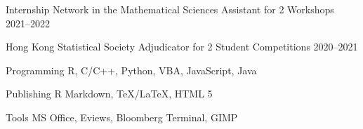 

\begin{cvhonors}
  \cvhonor
    {Internship Network in the Mathematical Sciences} %
    {Assistant for 2 Workshops} %
    {} %
    {2021--2022} %

  \cvhonor
    {Hong Kong Statistical Society} %
    {Adjudicator for 2 Student Competitions} %
    {} %
    {2020--2021} %

\end{cvhonors}

%
%
%

\begin{cvskills}

  \cvskill
    {Programming} %
    {} %
    {R, C/C++, Python, VBA, JavaScript, Java} %

  \cvskill
    {Publishing} %
    {} %
    {R Markdown, TeX/LaTeX, HTML 5} %

  \cvskill
    {Tools} %
    {} %
    {MS Office, Eviews, Bloomberg Terminal, GIMP} %

\end{cvskills}
